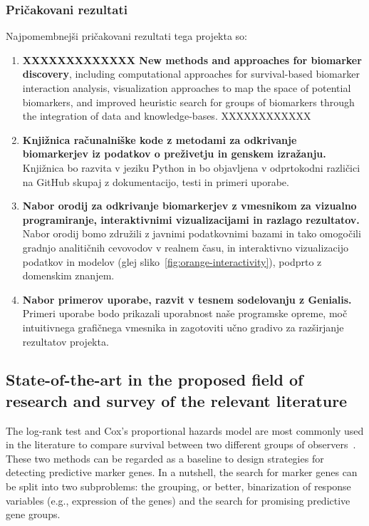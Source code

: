 \documentclass[11pt,a4paper]{article}
\renewcommand{\bold}{\textbf}
\begin{document}
\subsubsection*{Pričakovani rezultati}
Najpomembnejši pričakovani rezultati tega projekta so:
\begin{enumerate}
	\item \bold{XXXXXXXXXXXXX New methods and approaches for biomarker discovery}, including computational approaches for survival-based biomarker interaction analysis, visualization approaches to map the space of potential biomarkers, and improved heuristic search for groups of biomarkers through the integration of data and knowledge-bases. XXXXXXXXXXXX
	\item \bold{Knjižnica računalniške kode z metodami za odkrivanje biomarkerjev iz podatkov o preživetju in genskem izražanju.} Knjižnica bo razvita v jeziku Python in bo objavljena v odprtokodni različici na GitHub skupaj z dokumentacijo, testi in primeri uporabe.
	\item \bold{Nabor orodij za odkrivanje biomarkerjev z vmesnikom za vizualno programiranje, interaktivnimi vizualizacijami in razlago rezultatov.} Nabor orodij bomo združili z javnimi podatkovnimi bazami in tako omogočili gradnjo analitičnih cevovodov v realnem času, in interaktivno vizualizacijo podatkov in modelov (glej sliko~\ref{fig:orange-interactivity}), podprto z domenskim znanjem.
	\item \bold{Nabor primerov uporabe, razvit v tesnem sodelovanju z Genialis.} Primeri uporabe bodo prikazali uporabnost naše programske opreme, moč intuitivnega grafičnega vmesnika in zagotoviti učno gradivo za razširjanje rezultatov projekta.
\end{enumerate}



\subsection{State-of-the-art in the proposed field of research and survey of the relevant literature}

The log-rank test and Cox's proportional hazards model are most commonly used in the literature to compare survival between two different groups of observers~\cite{singh2011survival}. These two methods can be regarded as a baseline to design strategies for detecting predictive marker genes. In a nutshell, the search for marker genes can be split into two subproblems: the grouping, or better, binarization of response variables (e.g., expression of the genes) and the search for promising predictive gene groups.
\end{document}
